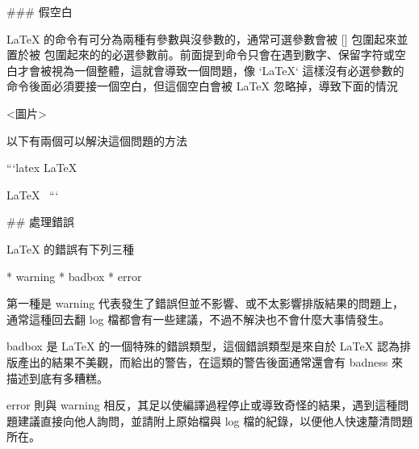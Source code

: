 \begin{markdown}
### 假空白

LaTeX 的命令有可分為兩種有參數與沒參數的，通常可選參數會被 [] 包圍起來並置於被 {} 包圍起來的的必選參數前。前面提到命令只會在遇到數字、保留字符或空白才會被視為一個整體，這就會導致一個問題，像 `\LaTeX` 這樣沒有必選參數的命令後面必須要接一個空白，但這個空白會被 LaTeX 忽略掉，導致下面的情況

<圖片>

以下有兩個可以解決這個問題的方法

```latex
\LaTeX{}%

\LaTeX\ %
```

## 處理錯誤

LaTeX 的錯誤有下列三種

* warning
* badbox
* error

第一種是 warning 代表發生了錯誤但並不影響、或不太影響排版結果的問題上，通常這種回去翻 log 檔都會有一些建議，不過不解決也不會什麼大事情發生。

badbox 是 LaTeX 的一個特殊的錯誤類型，這個錯誤類型是來自於 LaTeX 認為排版產出的結果不美觀，而給出的警告，在這類的警告後面通常還會有 badness 來描述到底有多糟糕。

error 則與 warning 相反，其足以使編譯過程停止或導致奇怪的結果，遇到這種問題建議直接向他人詢問，並請附上原始檔與 log 檔的紀錄，以便他人快速釐清問題所在。

\end{markdown}